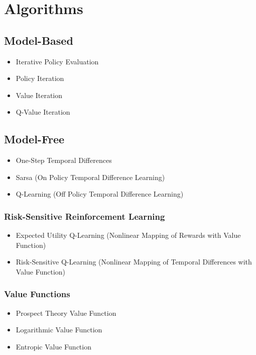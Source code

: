 \documentclass{article}
\begin{document}

\section{Algorithms}
\subsection{Model-Based}
\begin{itemize}
\item Iterative Policy Evaluation
\item Policy Iteration
\item Value Iteration
\item Q-Value Iteration
\end{itemize}

\subsection{Model-Free}
\begin{itemize}
\item One-Step Temporal Differences
\item Sarsa (On Policy Temporal Difference Learning)
\item Q-Learning (Off Policy Temporal Difference Learning)
\end{itemize}
\subsubsection{Risk-Sensitive Reinforcement Learning}
\begin{itemize}
\item Expected Utility Q-Learning (Nonlinear Mapping of Rewards with Value Function)
\item Risk-Sensitive Q-Learning (Nonlinear Mapping of Temporal Differences with Value Function)
\end{itemize}
\subsubsection{Value Functions}
\begin{itemize}
\item Prospect Theory Value Function
\item Logarithmic Value Function
\item Entropic Value Function
\end{itemize}
\end{document}
